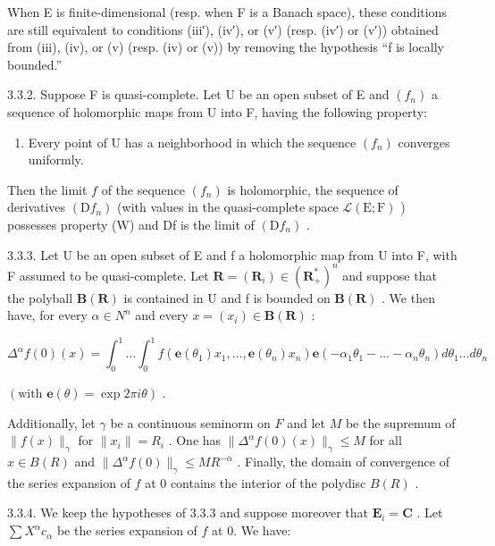 When E is finite-dimensional (resp. when F is a Banach space), these conditions are still equivalent to conditions (iii′), (iv′), or (v′) (resp. (iv′) or (v′)) obtained from (iii), (iv), or (v) (resp. (iv) or (v)) by removing the hypothesis “f is locally bounded.”

3.3.2. Suppose F is quasi-complete. Let U be an open subset of E and \((f_{n})\) a sequence of holomorphic maps from U into F, having the following property:

\begin{enumerate}
\def\labelenumi{(\Alph{enumi})}
\setcounter{enumi}{22}
\tightlist
\item
  Every point of U has a neighborhood in which the sequence \((f_{n})\) converges uniformly.
\end{enumerate}

Then the limit \(f\) of the sequence \((f_{n})\) is holomorphic, the sequence of derivatives \((\mathrm{D}f_{n})\) (with values in the quasi-complete space \(\mathcal{L}(\mathrm{E};\mathrm{F})\) ) possesses property (W) and Df is the limit of \((\mathrm{D}f_{n})\) .

3.3.3. Let U be an open subset of E and f a holomorphic map from U into F, with F assumed to be quasi-complete. Let \(\mathbf{R} = (\mathbf{R}_{i}) \in (\mathbf{R}_{+}^{*})^{n}\) and suppose that the polyball \(\mathbf{B}(\mathbf{R})\) is contained in U and f is bounded on \(\mathbf{B}(\mathbf{R})\) . We then have, for every \(\alpha \in N^{n}\) and every \(x = (x_{i}) \in \mathbf{B}(\mathbf{R})\) :

\[
\Delta^ {\alpha} f (0) (x) = \int_ {0} ^ {1} \dots \int_ {0} ^ {1} f (\mathbf {e} (\theta_ {1}) x _ {1}, \dots , \mathbf {e} (\theta_ {n}) x _ {n}) \mathbf {e} (- \alpha_ {1} \theta_ {1} - \dots - \alpha_ {n} \theta_ {n}) d \theta_ {1} \dots d \theta_ {n}
\]

\((\text{with } \mathbf{e}(\theta) = \exp 2\pi i \theta)\) .

Additionally, let \(\gamma\) be a continuous seminorm on \(F\) and let \(M\) be the supremum of \(\|f(x)\|_{\gamma}\) for \(\|x_{i}\|=R_{i}\) . One has \(\|\Delta^{\alpha}f(0)(x)\|_{\gamma}\leqslant M\) for all \(x\in B(R)\) and \(\|\Delta^{\alpha}f(0)\|_{\gamma}\leqslant MR^{-\alpha}\) . Finally, the domain of convergence of the series expansion of \(f\) at 0 contains the interior of the polydisc \(B(R)\) .

3.3.4. We keep the hypotheses of 3.3.3 and suppose moreover that \(\mathbf{E}_i = \mathbf{C}\) . Let \(\sum X^{\alpha}c_{\alpha}\) be the series expansion of \(f\) at 0. We have:

